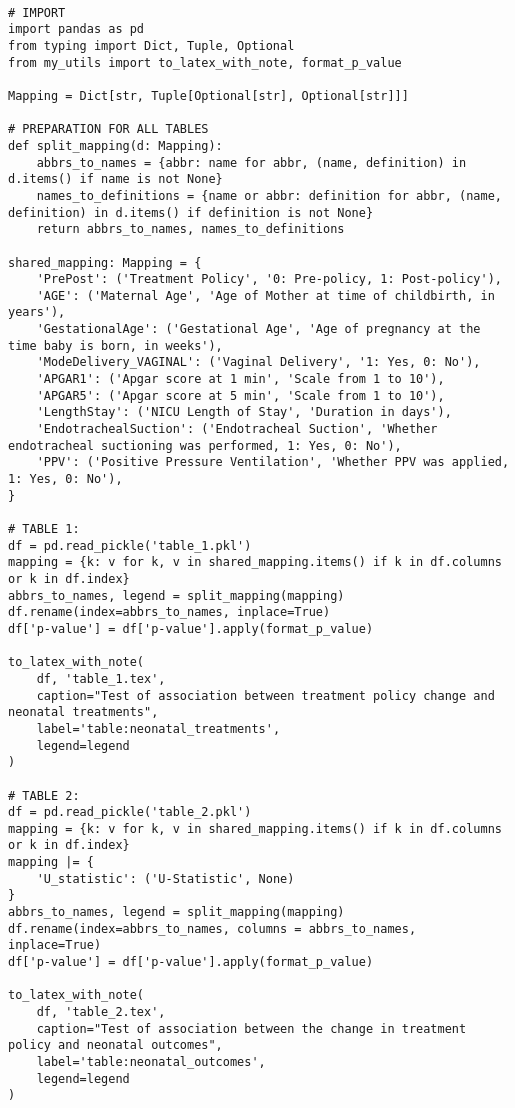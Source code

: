 \documentclass[11pt]{article}
\begin{document}
\begin{verbatim}

# IMPORT
import pandas as pd
from typing import Dict, Tuple, Optional
from my_utils import to_latex_with_note, format_p_value

Mapping = Dict[str, Tuple[Optional[str], Optional[str]]]

# PREPARATION FOR ALL TABLES
def split_mapping(d: Mapping):
    abbrs_to_names = {abbr: name for abbr, (name, definition) in d.items() if name is not None}
    names_to_definitions = {name or abbr: definition for abbr, (name, definition) in d.items() if definition is not None}
    return abbrs_to_names, names_to_definitions

shared_mapping: Mapping = {
    'PrePost': ('Treatment Policy', '0: Pre-policy, 1: Post-policy'),
    'AGE': ('Maternal Age', 'Age of Mother at time of childbirth, in years'),
    'GestationalAge': ('Gestational Age', 'Age of pregnancy at the time baby is born, in weeks'),
    'ModeDelivery_VAGINAL': ('Vaginal Delivery', '1: Yes, 0: No'),
    'APGAR1': ('Apgar score at 1 min', 'Scale from 1 to 10'),
    'APGAR5': ('Apgar score at 5 min', 'Scale from 1 to 10'),
    'LengthStay': ('NICU Length of Stay', 'Duration in days'),
    'EndotrachealSuction': ('Endotracheal Suction', 'Whether endotracheal suctioning was performed, 1: Yes, 0: No'),
    'PPV': ('Positive Pressure Ventilation', 'Whether PPV was applied, 1: Yes, 0: No'),
}

# TABLE 1:
df = pd.read_pickle('table_1.pkl')
mapping = {k: v for k, v in shared_mapping.items() if k in df.columns or k in df.index}
abbrs_to_names, legend = split_mapping(mapping)
df.rename(index=abbrs_to_names, inplace=True)
df['p-value'] = df['p-value'].apply(format_p_value)

to_latex_with_note(
    df, 'table_1.tex',
    caption="Test of association between treatment policy change and neonatal treatments", 
    label='table:neonatal_treatments',
    legend=legend
)

# TABLE 2:
df = pd.read_pickle('table_2.pkl')
mapping = {k: v for k, v in shared_mapping.items() if k in df.columns or k in df.index}
mapping |= {
    'U_statistic': ('U-Statistic', None)
}
abbrs_to_names, legend = split_mapping(mapping)
df.rename(index=abbrs_to_names, columns = abbrs_to_names, inplace=True)
df['p-value'] = df['p-value'].apply(format_p_value)

to_latex_with_note(
    df, 'table_2.tex',
    caption="Test of association between the change in treatment policy and neonatal outcomes", 
    label='table:neonatal_outcomes',
    legend=legend
)


\end{verbatim}
\end{document}
